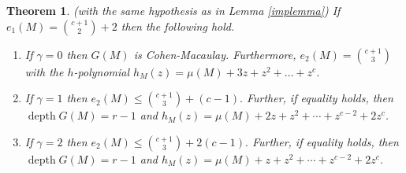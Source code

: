 \documentclass[11pt]{amsart}
\theoremstyle{plain}
\newtheorem{theorem}{Theorem}[section]
\newcommand{\depth}{\operatorname{depth}}
\theoremstyle{plain}
\begin{document}
\begin{theorem}\label{main}
    (with the same hypothesis as in Lemma \ref{implemma}) If $e_1(M)=\binom{c+1}{2}+2$ then the following hold. 
     \begin{enumerate}
         \item \label{2+11} If $\gamma=0$ then $G(M)$ is Cohen-Macaulay. Furthermore,   $e_2(M)=\binom{c+1}{3}$ with the $h$-polynomial $h_M(z)=\mu(M)+3z+z^2+\ldots +z^c$. 
         \item \label{2+12}  If $\gamma=1$ then $e_2(M)\leq \binom{c+1}{3}+(c-1).$ Further, if equality holds, then $\depth G(M)= r-1$ and $h_M(z)=\mu(M)+2z+z^2+\cdots+z^{c-2}+2z^c$.
          \item \label{2+13} If $\gamma=2$ then $e_2(M)\leq \binom{c+1}{3}+2(c-1).$ Further, if equality holds, then $\depth G(M)= r-1$ and $h_M(z)= \mu(M)+z+z^2+\cdots+z^{c-2}+2z^c$.
     \end{enumerate} 
\end{theorem}
\end{document}
